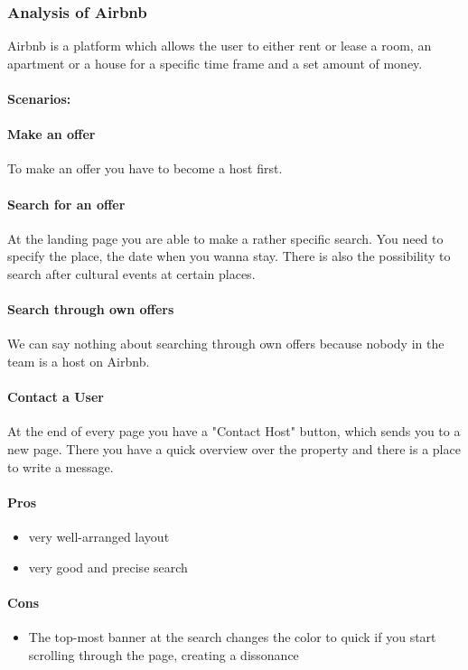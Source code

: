 	\subsubsection{Analysis of Airbnb}
		Airbnb is a platform which allows the user to either rent or lease a room, an apartment or a house for a specific time frame and a set amount of money.
		
		\paragraph{Scenarios:}
		
		\paragraph{Make an offer}
		To make an offer you have to become a host first.
		
		\paragraph{Search for an offer}
		At the landing page you are able to make a rather specific search. You need to specify the place, the date when you wanna stay. There is also the possibility to search after cultural events at certain places.
		
		\paragraph{Search through own offers}
		We can say nothing about searching through own offers because nobody in the team is a host on Airbnb.
		
		\paragraph{Contact a User}
		At the end of every page you have a "Contact Host" button, which sends you to a new page. There you have a quick overview over the property and there is a place to write a message.
		
		\paragraph{Pros}
		\begin{itemize}
			\item very well-arranged layout
			\item very good and precise search
		\end{itemize}
	
		\paragraph{Cons}
		\begin{itemize}
			\item The top-most banner at the search changes the color to quick if you start scrolling through the page, creating a dissonance
		\end{itemize}
	